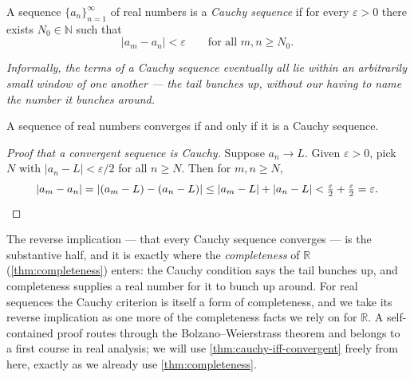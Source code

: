 \begin{definition}\label{def:cauchy-sequence}
A sequence \(\{a_{n}\}_{n = 1}^{\infty}\) of real numbers is a \emph{Cauchy sequence} if for every \(\varepsilon > 0\) there exists \(N_{0} \in \mathbb{N}\) such that
\[
\lvert a_{m} - a_{n} \rvert < \varepsilon \qquad \text{for all } m, n \ge N_{0}.
\]

\emph{Informally, the terms of a Cauchy sequence eventually all lie within an arbitrarily small window of one another --- the tail bunches up, without our having to name the number it bunches around.}
\end{definition}

\begin{theorem}\label{thm:cauchy-iff-convergent}
A sequence of real numbers converges if and only if it is a Cauchy sequence.
\end{theorem}

\begin{proof}[Proof that a convergent sequence is Cauchy]
Suppose \(a_{n} \to L\). Given \(\varepsilon > 0\), pick \(N\) with \(\lvert a_{n} - L \rvert < \varepsilon/2\) for all \(n \ge N\). Then for \(m, n \ge N\),
\[
\lvert a_{m} - a_{n} \rvert = \lvert (a_{m} - L) - (a_{n} - L) \rvert \le \lvert a_{m} - L \rvert + \lvert a_{n} - L \rvert < \tfrac{\varepsilon}{2} + \tfrac{\varepsilon}{2} = \varepsilon. \qedhere
\]
\end{proof}

\begin{remark}
The reverse implication --- that every Cauchy sequence converges --- is the substantive half, and it is exactly where the \emph{completeness} of \(\mathbb{R}\) (\cref{thm:completeness}) enters: the Cauchy condition says the tail bunches up, and completeness supplies a real number for it to bunch up around. For real sequences the Cauchy criterion is itself a form of completeness, and we take its reverse implication as one more of the completeness facts we rely on for \(\mathbb{R}\). A self-contained proof routes through the Bolzano--Weierstrass theorem and belongs to a first course in real analysis; we will use \cref{thm:cauchy-iff-convergent} freely from here, exactly as we already use \cref{thm:completeness}.
\end{remark}

